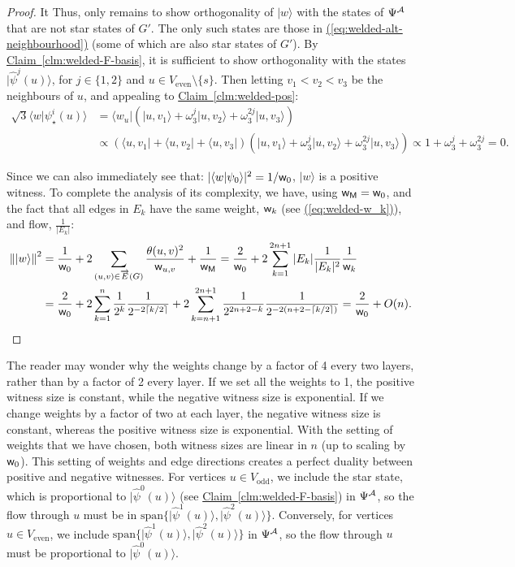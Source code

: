 \documentclass{theoretics}
\newcommand{\eq}[1]{\hyperref[eq:#1]{(\ref*{eq:#1})}}
\newcommand{\clm}[1]{\hyperref[clm:#1]{Claim~\ref*{clm:#1}}}
\def\ket#1{{\lvert}#1\rangle}
\def\bra#1{{\langle}#1\rvert}
\renewcommand{\>}{\rangle}
\newcommand{\<}{\langle}
\renewcommand{\(}{\left(}
\renewcommand{\)}{\right)}
\def\braket#1#2{{{\langle}#1\vert}#2\rangle}
\def\norm#1{\left\| #1 \right\|}
\def\w{{\sf w}}
\begin{document}
\begin{proof}
It Thus, only remains to show orthogonality of $\ket{w}$ with the states of $\Psi^{\cal A}$ that are not star states of $G'$. The only such states are those in \eq{welded-alt-neighbourhood} (some of which are also star states of $G'$). By \clm{welded-F-basis}, it is sufficient to show orthogonality with the states $\ket{\widehat{\psi}^j(u)}$, for $j\in\{1,2\}$ and $u\in V_{\mathrm{even}}\setminus\{s\}$. 
Then letting $v_1<v_2<v_3$ be the neighbours of $u$, and appealing to \clm{welded-pos}:
\begin{align*}
\sqrt{3}\braket{w}{\psi_\star^i(u)}
&= \bra{w_u}\left(\ket{u,v_1}+\omega_3^j\ket{u,v_2}+\omega_3^{2j}\ket{u,v_3}\right)\\
&\propto \left(\bra{u,v_1}+\bra{u,v_2}+\bra{u,v_3} \right)\left(\ket{u,v_1}+\omega_3^j\ket{u,v_2}+\omega_3^{2j}\ket{u,v_3}\right)
\propto 1+\omega_3^j+\omega_3^{2j} = 0.
\end{align*}

Since we can also immediately see that:
$|\braket{w}{\psi_0}|^2  = {1}/{\w_0}$,
$\ket{w}$ is a positive witness. To complete the analysis of its complexity, we have, using $\w_{\sf M}=\w_0$, and the fact that all edges in $E_k$ have the same weight, $\w_k$ (see \eq{welded-w_k}), and flow, $\frac{1}{|E_k|}$:
\begin{align*}
\norm{\ket{w}}^2 &= \frac{1}{\w_0}+ 2\sum_{(u,v)\in\overrightarrow{E}(G)}\frac{\theta(u,v)^2}{\w_{u,v}}+\frac{1}{\w_{\sf M}}
=\frac{2}{\w_0} + 2\sum_{k=1}^{2n+1}|E_k|\frac{1}{|E_k|^2}\frac{1}{\w_k}\\
&= \frac{2}{\w_0}+2\sum_{k=1}^n\frac{1}{2^k}\frac{1}{2^{-2\lceil k/2\rceil}} + 2\sum_{k=n+1}^{2n+1}\frac{1}{2^{2n+2-k}}\frac{1}{2^{-2(n+2-\lceil k/2\rceil)}}  
= \frac{2}{\w_0}+O(n).\qedhere
\end{align*}
\end{proof}

\begin{remark}\label{rmk:flow-duality}
The reader may wonder why the weights change by a factor of 4 every two layers, rather than by a factor of 2 every layer. If we set all the weights to 1, the positive witness size is constant, while the negative witness size is exponential. If we change weights by a factor of two at each layer, the negative witness size is constant, whereas the positive witness size is exponential. With the setting of weights that we have chosen, both witness sizes are linear in $n$ (up to scaling by $\w_0$). This setting of weights and edge directions creates a perfect duality between positive and negative witnesses. For vertices $u\in V_{\mathrm{odd}}$, we include the star state, which is proportional to $\ket{\widehat{\psi}^0(u)}$ (see \clm{welded-F-basis}) in $\Psi^{\cal A}$, so the flow through $u$ must be in $\mathrm{span}\{\ket{\widehat{\psi}^1(u)},\ket{\widehat{\psi}^2(u)}\}$. Conversely, for vertices $u\in V_{\mathrm{even}}$, we include $\mathrm{span}\{\ket{\widehat{\psi}^1(u)},\ket{\widehat{\psi}^2(u)}\}$ in $\Psi^{\cal A}$, so the flow through $u$ must be proportional to $\ket{\widehat{\psi}^0(u)}$.
\end{remark}
\end{document}
